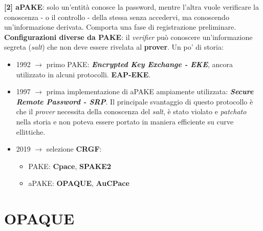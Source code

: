 \begin{flushleft}
    \smallskip

    \textbf{[2] aPAKE}: solo un'entità conosce la password, mentre l'altra vuole verificare la conoscenza - o il controllo - della stessa senza accedervi, ma conoscendo un'informazione derivata. Comporta una fase di registrazione preliminare. \\
    \textbf{Configurazioni diverse da PAKE}: il \textit{verifier} può conoscere un'informazione segreta (\textit{salt}) che non deve essere rivelata al \textbf{prover}. Un po' di storia:
    \begin{itemize}[nosep]
        \item 1992 $\rightarrow$ primo PAKE: \textbf{\textit{Encrypted Key Exchange - EKE}}, ancora utilizzato in alcuni protocolli. \textbf{EAP-EKE}.
        \item 1997 $\rightarrow$ prima implementazione di aPAKE ampiamente utilizzata: \textbf{\textit{Secure Remote Password - SRP}}. Il principale svantaggio di questo protocollo è che il \textit{prover} necessita della conoscenza del \textit{salt}, è stato violato e \textit{patchato} nella storia e non poteva essere portato in maniera efficiente su curve ellittiche.
        \item 2019 $\rightarrow$ selezione \textbf{CRGF}:
        \begin{itemize}[nosep]
            \item PAKE: \textbf{Cpace}, \textbf{SPAKE2}
            \item aPAKE: \textbf{OPAQUE}, \textbf{AuCPace}
        \end{itemize}
    \end{itemize}

\end{flushleft}

\section{OPAQUE}

